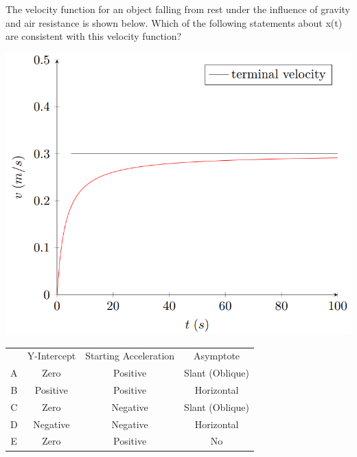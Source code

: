 \newpage
\begin{question}
The velocity function for an object falling from rest under the influence of gravity and air resistance is shown below. Which of the following statements about x(t) are consistent with this velocity function?





\includegraphics{Figures/Figure12}

\begin{tabular}{ |c|c|c|c| } 
 \hline
       & Y-Intercept & Starting Acceleration & Asymptote \\ 
 A     & Zero & Positive & Slant (Oblique)\\  
 B     & Positive & Positive & Horizontal\\ 
 C     & Zero & Negative & Slant (Oblique)\\ 
 D     & Negative & Negative & Horizontal\\ 
 E     & Zero & Positive & No\\ 
 \hline
\end{tabular}\\

\end{question}

